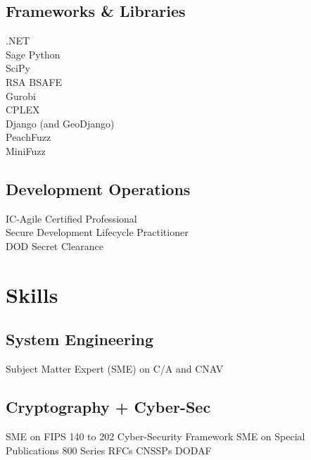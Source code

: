 \documentclass[letterpaper]{clinton-resume}
\begin{document}
\begin{minipage}[t]{0.33\textwidth}
\sectionspace %

\subsection{Frameworks \& Libraries}
.NET\\
Sage Python\\
SciPy\\
RSA BSAFE\\
Gurobi\\
CPLEX\\
Django (and GeoDjango)\\
PeachFuzz\\
MiniFuzz\\
\sectionspace %
\subsection{Development Operations}
IC-Agile Certified Professional\\
Secure Development Lifecycle Practitioner\\
DOD Secret Clearance\\
\sectionspace %
\section{Skills}
\subsection{System Engineering}
Subject Matter Expert (SME) on C/A and CNAV
\subsection{Cryptography + Cyber-Sec}
SME on FIPS 140 to 202 \textbullet{} Cyber-Security Framework \textbullet{} SME on Special Publications 800 Series \textbullet{} RFCs \textbullet{} CNSSPs \textbullet{} DODAF\\
\end{minipage}
\end{document}
